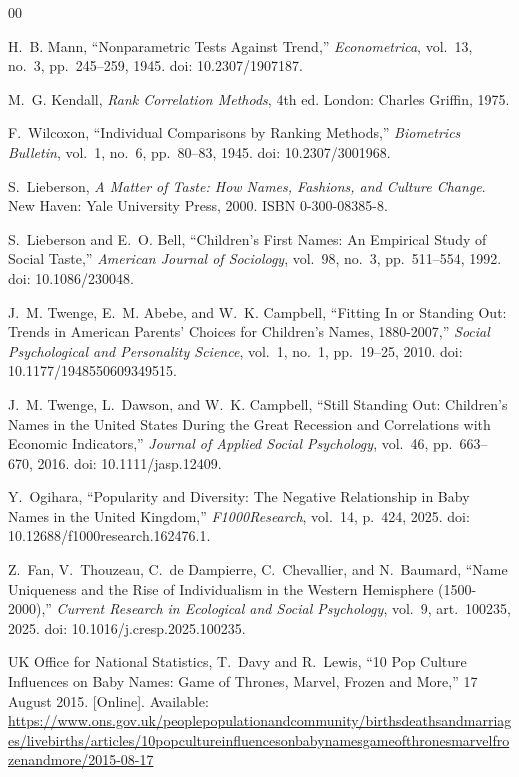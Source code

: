 \documentclass[conference]{IEEEtran}
\begin{document}
\begin{thebibliography}{00}

 H.~B. Mann, ``Nonparametric Tests Against Trend,'' \emph{Econometrica}, vol.~13,
no.~3, pp.~245--259, 1945. doi: 10.2307/1907187.

 M.~G. Kendall, \emph{Rank Correlation Methods}, 4th ed. London: Charles
Griffin, 1975.

 F.~Wilcoxon, ``Individual Comparisons by Ranking Methods,'' \emph{Biometrics
Bulletin}, vol.~1, no.~6, pp.~80--83, 1945. doi: 10.2307/3001968.

 S.~Lieberson, \emph{A Matter of Taste: How Names, Fashions, and Culture Change}. New Haven: Yale University Press, 2000. ISBN 0-300-08385-8.

 S.~Lieberson and E.~O. Bell, ``Children's First Names: An Empirical Study of
Social Taste,'' \emph{American Journal of Sociology}, vol.~98, no.~3, pp.~511--554, 1992.
doi: 10.1086/230048.

 J.~M. Twenge, E.~M. Abebe, and W.~K. Campbell, ``Fitting In or Standing Out:
Trends in American Parents' Choices for Children's Names, 1880-2007,'' \emph{Social Psychological and
Personality Science}, vol.~1, no.~1, pp.~19--25, 2010. doi: 10.1177/1948550609349515.

 J.~M. Twenge, L.~Dawson, and W.~K. Campbell, ``Still Standing Out: Children's
Names in the United States During the Great Recession and Correlations with Economic Indicators,''
\emph{Journal of Applied Social Psychology}, vol.~46, pp.~663--670, 2016. doi: 10.1111/jasp.12409.

 Y.~Ogihara, ``Popularity and Diversity: The Negative Relationship in Baby
Names in the United Kingdom,'' \emph{F1000Research}, vol.~14, p.~424, 2025.
doi: 10.12688/f1000research.162476.1.

 Z.~Fan, V.~Thouzeau, C.~de Dampierre, C.~Chevallier, and N.~Baumard, ``Name
Uniqueness and the Rise of Individualism in the Western Hemisphere (1500-2000),'' \emph{Current
Research in Ecological and Social Psychology}, vol.~9, art.~100235, 2025.
doi: 10.1016/j.cresp.2025.100235.

 UK Office for National Statistics, T.~Davy and R.~Lewis, ``10 Pop Culture
Influences on Baby Names: Game of Thrones, Marvel, Frozen and More,'' 17 August 2015. [Online].
Available: \url{https://www.ons.gov.uk/peoplepopulationandcommunity/birthsdeathsandmarriages/livebirths/articles/10popcultureinfluencesonbabynamesgameofthronesmarvelfrozenandmore/2015-08-17}

\end{thebibliography}
\end{document}
